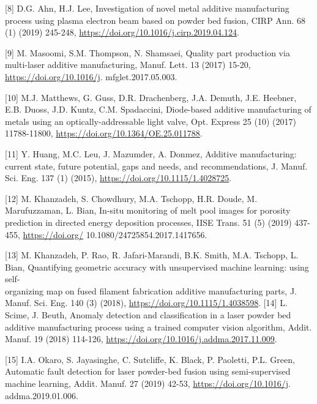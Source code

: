 \documentclass[10pt]{article}
\begin{document}
[8] D.G. Ahn, H.J. Lee, Investigation of novel metal additive manufacturing process using plasma electron beam based on powder bed fusion, CIRP Ann. 68 (1) (2019) 245-248, \href{https://doi.org/10.1016/j.cirp.2019.04.124}{https://doi.org/10.1016/j.cirp.2019.04.124}.

[9] M. Masoomi, S.M. Thompson, N. Shamsaei, Quality part production via multi-laser additive manufacturing, Manuf. Lett. 13 (2017) 15-20, \href{https://doi.org/10.1016/j}{https://doi.org/10.1016/j}. mfglet.2017.05.003.

[10] M.J. Matthews, G. Guss, D.R. Drachenberg, J.A. Demuth, J.E. Heebner, E.B. Duoss, J.D. Kuntz, C.M. Spadaccini, Diode-based additive manufacturing of metals using an optically-addressable light valve, Opt. Express 25 (10) (2017) 11788-11800, \href{https://doi.org/10.1364/OE.25.011788}{https://doi.org/10.1364/OE.25.011788}.

[11] Y. Huang, M.C. Leu, J. Mazumder, A. Donmez, Additive manufacturing: current state, future potential, gaps and needs, and recommendations, J. Manuf. Sci. Eng. 137 (1) (2015), \href{https://doi.org/10.1115/1.4028725}{https://doi.org/10.1115/1.4028725}.

[12] M. Khanzadeh, S. Chowdhury, M.A. Tschopp, H.R. Doude, M. Marufuzzaman, L. Bian, In-situ monitoring of melt pool images for porosity prediction in directed energy deposition processes, IISE Trans. 51 (5) (2019) 437-455, \href{https://doi.org/}{https://doi.org/} 10.1080/24725854.2017.1417656.

[13] M. Khanzadeh, P. Rao, R. Jafari-Marandi, B.K. Smith, M.A. Tschopp, L. Bian, Quantifying geometric accuracy with unsupervised machine learning: using self-\\
organizing map on fused filament fabrication additive manufacturing parts, J. Manuf. Sci. Eng. 140 (3) (2018), \href{https://doi.org/10.1115/1.4038598}{https://doi.org/10.1115/1.4038598}. [14] L. Scime, J. Beuth, Anomaly detection and classification in a laser powder bed additive manufacturing process using a trained computer vision algorithm, Addit. Manuf. 19 (2018) 114-126, \href{https://doi.org/10.1016/j.addma.2017.11.009}{https://doi.org/10.1016/j.addma.2017.11.009}.

[15] I.A. Okaro, S. Jayasinghe, C. Sutcliffe, K. Black, P. Paoletti, P.L. Green, Automatic fault detection for laser powder-bed fusion using semi-supervised machine learning, Addit. Manuf. 27 (2019) 42-53, \href{https://doi.org/10.1016/j}{https://doi.org/10.1016/j}. addma.2019.01.006.
\end{document}
